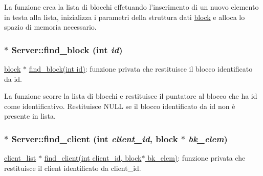 La funzione crea la lista di blocchi effetuando l'inserimento di un nuovo elemento in testa alla lista, inizializza i parametri della struttura dati \hyperlink{structblock}{block} e alloca lo spazio di memoria necessario. \hypertarget{classServer_93fae32902bc34db18eda8513e26fd97_93fae32902bc34db18eda8513e26fd97}{
\subsubsection[{find\_\-block}]{$\ast$ Server::find\_\-block (int {\em id})}}
\label{classServer_93fae32902bc34db18eda8513e26fd97_93fae32902bc34db18eda8513e26fd97}


\hyperlink{structblock}{block} $\ast$ \hyperlink{classServer_93fae32902bc34db18eda8513e26fd97_93fae32902bc34db18eda8513e26fd97}{find\_\-block(int id)}: funzione privata che restituisce il blocco identificato da id. 

La funzione scorre la lista di blocchi e restituisce il puntatore al blocco che ha id come identificativo. Restituisce NULL se il blocco identificato da id non è presente in lista. \hypertarget{classServer_186c395ce5cefdbb598489ddc70f24d2_186c395ce5cefdbb598489ddc70f24d2}{
\subsubsection[{find\_\-client}]{$\ast$ Server::find\_\-client (int {\em client\_\-id}, \/  {\bf block} $\ast$ {\em bk\_\-elem})}}
\label{classServer_186c395ce5cefdbb598489ddc70f24d2_186c395ce5cefdbb598489ddc70f24d2}


\hyperlink{structclient__list}{client\_\-list} $\ast$ \hyperlink{classServer_186c395ce5cefdbb598489ddc70f24d2_186c395ce5cefdbb598489ddc70f24d2}{find\_\-client(int client\_\-id, block$\ast$ bk\_\-elem)}: funzione privata che restituisce il client identificato da client\_\-id. 

